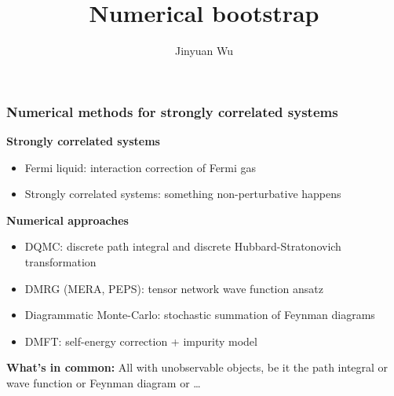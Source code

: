 \documentclass{beamer}
\title{Numerical bootstrap}
\author{Jinyuan Wu}
\institute{Department of Physics, Fudan University}
\begin{document}
\frame{\titlepage}

\begin{frame}
\frametitle{Numerical methods for strongly correlated systems}

\textbf{Strongly correlated systems}

\begin{itemize}
    \item Fermi liquid: interaction correction of Fermi gas
    \item Strongly correlated systems: something non-perturbative happens
\end{itemize}

\textbf{Numerical approaches}

\begin{itemize}
    \item DQMC: discrete path integral and discrete Hubbard-Stratonovich transformation
    \item DMRG (MERA, PEPS): tensor network wave function ansatz
    \item Diagrammatic Monte-Carlo: stochastic summation of Feynman diagrams
    \item DMFT: self-energy correction + impurity model
\end{itemize}

\textbf{What's in common:} All with unobservable objects, be it the path integral or wave function or Feynman diagram or \dots 

\end{frame}
\end{document}
